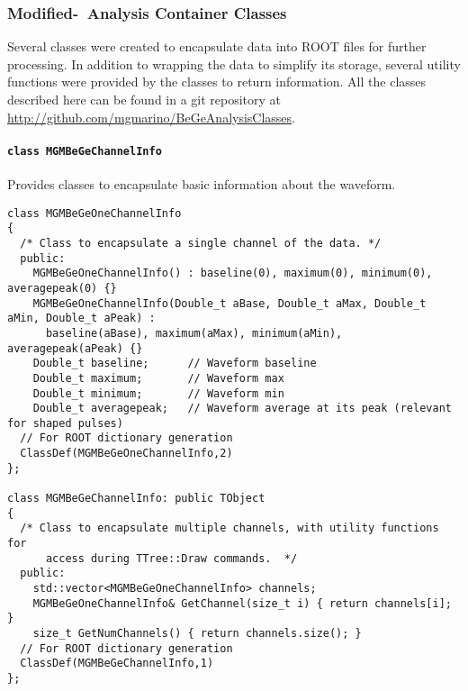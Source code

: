 			\subsubsection{Modified-\bege~Analysis Container Classes}
Several classes were created to encapsulate data into ROOT files for further processing.  In addition to wrapping the data to simplify its storage, several utility functions were provided by the classes to return information.  All the classes described here can be found in a git repository at \url{http://github.com/mgmarino/BeGeAnalysisClasses}.  
				\paragraph{\lstinline!class MGMBeGeChannelInfo!}
Provides classes to encapsulate basic information about the waveform.
					\begin{lstlisting}
class MGMBeGeOneChannelInfo
{
  /* Class to encapsulate a single channel of the data. */
  public:
    MGMBeGeOneChannelInfo() : baseline(0), maximum(0), minimum(0), averagepeak(0) {}
    MGMBeGeOneChannelInfo(Double_t aBase, Double_t aMax, Double_t aMin, Double_t aPeak) : 
      baseline(aBase), maximum(aMax), minimum(aMin), averagepeak(aPeak) {}
    Double_t baseline;		// Waveform baseline
    Double_t maximum;		// Waveform max
    Double_t minimum; 		// Waveform min
    Double_t averagepeak; 	// Waveform average at its peak (relevant for shaped pulses)
  // For ROOT dictionary generation    
  ClassDef(MGMBeGeOneChannelInfo,2)
};

class MGMBeGeChannelInfo: public TObject
{
  /* Class to encapsulate multiple channels, with utility functions for
      access during TTree::Draw commands.  */
  public:
    std::vector<MGMBeGeOneChannelInfo> channels;
    MGMBeGeOneChannelInfo& GetChannel(size_t i) { return channels[i]; } 
    size_t GetNumChannels() { return channels.size(); }
  // For ROOT dictionary generation
  ClassDef(MGMBeGeChannelInfo,1)
};					
					\end{lstlisting}					
